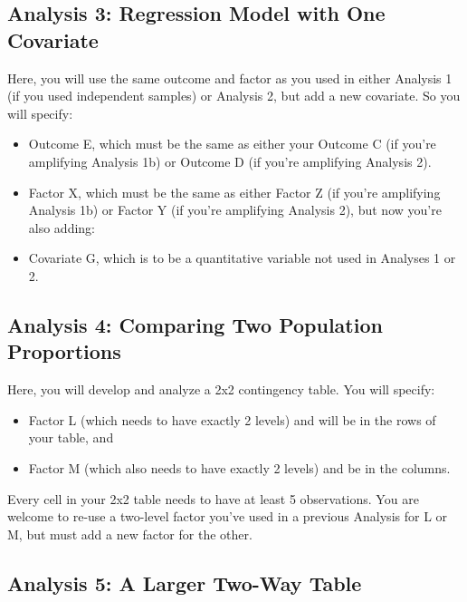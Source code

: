\documentclass[]{book}
\providecommand{\tightlist}{%
  \setlength{\itemsep}{0pt}\setlength{\parskip}{0pt}}
\begin{document}
\hypertarget{analysis-3-regression-model-with-one-covariate}{%
\subsection{Analysis 3: Regression Model with One Covariate}\label{analysis-3-regression-model-with-one-covariate}}

Here, you will use the same outcome and factor as you used in either Analysis 1 (if you used independent samples) or Analysis 2, but add a new covariate. So you will specify:

\begin{itemize}
\tightlist
\item
  Outcome E, which must be the same as either your Outcome C (if you're amplifying Analysis 1b) or Outcome D (if you're amplifying Analysis 2).
\item
  Factor X, which must be the same as either Factor Z (if you're amplifying Analysis 1b) or Factor Y (if you're amplifying Analysis 2), but now you're also adding:
\item
  Covariate G, which is to be a quantitative variable not used in Analyses 1 or 2.
\end{itemize}

\hypertarget{analysis-4-comparing-two-population-proportions}{%
\subsection{Analysis 4: Comparing Two Population Proportions}\label{analysis-4-comparing-two-population-proportions}}

Here, you will develop and analyze a 2x2 contingency table. You will specify:

\begin{itemize}
\tightlist
\item
  Factor L (which needs to have exactly 2 levels) and will be in the rows of your table, and
\item
  Factor M (which also needs to have exactly 2 levels) and be in the columns.
\end{itemize}

Every cell in your 2x2 table needs to have at least 5 observations. You are welcome to re-use a two-level factor you've used in a previous Analysis for L or M, but must add a new factor for the other.

\hypertarget{analysis-5-a-larger-two-way-table}{%
\subsection{Analysis 5: A Larger Two-Way Table}\label{analysis-5-a-larger-two-way-table}}
\end{document}
